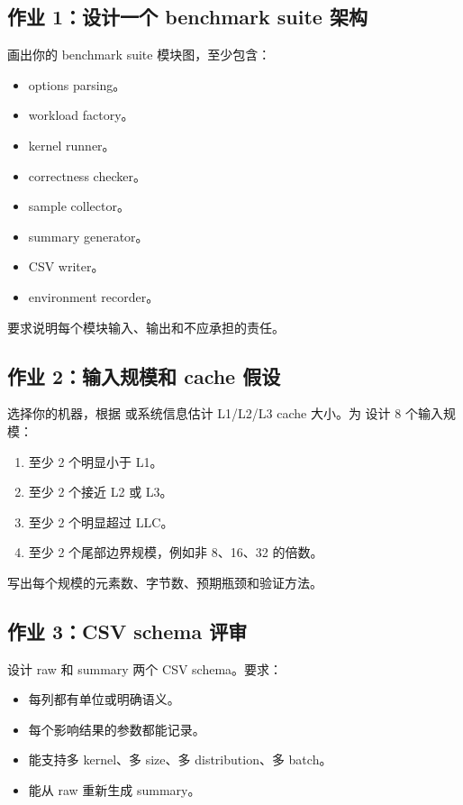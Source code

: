 \begin{exercisebox}
\subsection*{作业 1：设计一个 benchmark suite 架构}

画出你的 benchmark suite 模块图，至少包含：

\begin{itemize}
  \item options parsing。
  \item workload factory。
  \item kernel runner。
  \item correctness checker。
  \item sample collector。
  \item summary generator。
  \item CSV writer。
  \item environment recorder。
\end{itemize}

要求说明每个模块输入、输出和不应承担的责任。

\subsection*{作业 2：输入规模和 cache 假设}

选择你的机器，根据  或系统信息估计 L1/L2/L3 cache 大小。为  设计 8 个输入规模：

\begin{enumerate}
  \item 至少 2 个明显小于 L1。
  \item 至少 2 个接近 L2 或 L3。
  \item 至少 2 个明显超过 LLC。
  \item 至少 2 个尾部边界规模，例如非 8、16、32 的倍数。
\end{enumerate}

写出每个规模的元素数、字节数、预期瓶颈和验证方法。

\subsection*{作业 3：CSV schema 评审}

设计 raw 和 summary 两个 CSV schema。要求：

\begin{itemize}
  \item 每列都有单位或明确语义。
  \item 每个影响结果的参数都能记录。
  \item 能支持多 kernel、多 size、多 distribution、多 batch。
  \item 能从 raw 重新生成 summary。
\end{itemize}


\end{exercisebox}
